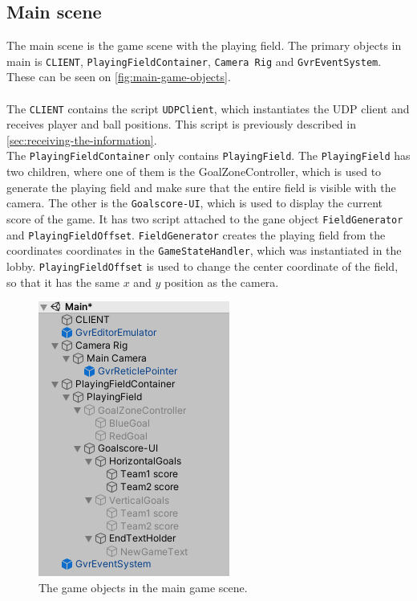 \subsection{Main scene}
The main scene is the game scene with the playing field.
The primary objects in main is \texttt{CLIENT}, \texttt{PlayingFieldContainer}, \texttt{Camera Rig} and \texttt{GvrEventSystem}.
These can be seen on \autoref{fig:main-game-objects}.
\\\\
The \texttt{CLIENT} contains the script \texttt{UDPClient}, which instantiates the UDP client and receives player and ball positions.
This script is previously described in \autoref{sec:receiving-the-information}.
\\
The \texttt{PlayingFieldContainer} only contains \texttt{PlayingField}.
The \texttt{PlayingField} has two children, where one of them is the GoalZoneController, which is used to generate the playing field and make sure that the entire field is visible with the camera.
The other is the \texttt{Goalscore-UI}, which is used to display the current score of the game.
It has two script attached to the gane object \texttt{FieldGenerator} and \texttt{PlayingFieldOffset}.
\texttt{FieldGenerator} creates the playing field from the coordinates coordinates in the \texttt{GameStateHandler}, which was instantiated in the lobby.
\texttt{PlayingFieldOffset} is used to change the center coordinate of the field, so that it has the same $x$ and $y$ position as the camera.



\begin{figure}[H]
    \centering
    \includegraphics[width=0.4\linewidth]{figures/unity-main-gameobjects.PNG}
    \caption{The game objects in the main game scene.}
    \label{fig:main-game-objects}
\end{figure}

